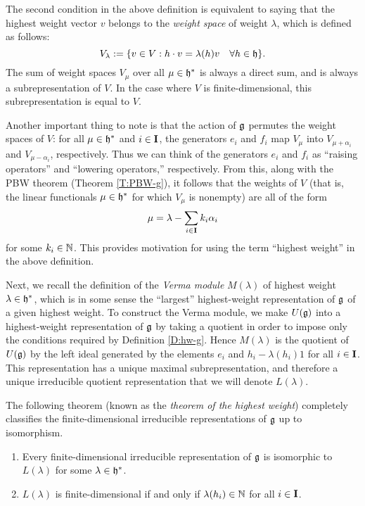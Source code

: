 The second condition in the above definition is equivalent to saying that the highest weight vector $v$ belongs to the \emph{weight space} of weight $\lambda$, which is defined as follows:
\[V_\lambda := \{v\in V : h\cdot v = \lambda(h)v \quad \forall h\in\mathfrak{h}\}.\]
The sum of weight spaces $V_\mu$ over all $\mu\in\mathfrak{h}^*$ is always a direct sum, and is always a subrepresentation of $V$.
In the case where $V$ is finite-dimensional, this subrepresentation is equal to $V$.

Another important thing to note is that the action of $\mathfrak{g}$ permutes the weight spaces of $V$: for all $\mu\in\mathfrak{h}^*$ and $i\in\mathbf{I}$, the generators $e_i$ and $f_i$ map $V_\mu$ into $V_{\mu+\alpha_i}$ and $V_{\mu-\alpha_i}$, respectively.
Thus we can think of the generators $e_i$ and $f_i$ as ``raising operators'' and ``lowering operators,'' respectively.
From this, along with the PBW theorem (Theorem \ref{T:PBW-g}), it follows that the weights of $V$ (that is, the linear functionals $\mu\in\mathfrak{h}^*$ for which $V_\mu$ is nonempty) are all of the form
\[\mu = \lambda - \sum_{i\in\mathbf{I}} k_i\alpha_i\]
for some $k_i\in\mathbb{N}$.
This provides motivation for using the term ``highest weight'' in the above definition.

Next, we recall the definition of the \emph{Verma module} $M(\lambda)$ of highest weight $\lambda\in\mathfrak{h}^*$, which is in some sense the ``largest'' highest-weight representation of $\mathfrak{g}$ of a given highest weight.
To construct the Verma module, we make $U(\mathfrak{g})$ into a highest-weight representation of $\mathfrak{g}$ by taking a quotient in order to impose only the conditions required by Definition \ref{D:hw-g}.
Hence $M(\lambda)$ is the quotient of $U(\mathfrak{g})$ by the left ideal generated by the elements $e_i$ and $h_i-\lambda(h_i)1$ for all $i\in\mathbf{I}$.
This representation has a unique maximal subrepresentation, and therefore a unique irreducible quotient representation that we will denote $L(\lambda)$.

The following theorem (known as the \emph{theorem of the highest weight}) completely classifies the finite-dimensional irreducible representations of $\mathfrak{g}$ up to isomorphism.

\begin{theorem}\label{T:hw-g}
    \begin{enumerate}
        \item Every finite-dimensional irreducible representation of $\mathfrak{g}$ is isomorphic to $L(\lambda)$ for some $\lambda\in\mathfrak{h}^*$.
        \item $L(\lambda)$ is finite-dimensional if and only if $\lambda(h_i)\in\mathbb{N}$ for all $i\in\mathbf{I}$.
    \end{enumerate}
\end{theorem}

